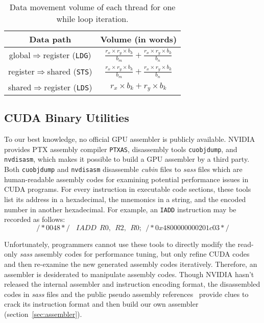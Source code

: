 \begin{table}[htbp]
    \caption{Data movement volume of each thread for one while loop iteration.} %
\centering
\scalebox{1.0} {
\begin{tabular}{|c|c|}
\hline
    Data path& Volume (in words)\\
\hline
    global$\Rightarrow$register ({\tt LDG})& $\frac{r_x \times r_y \times b_k}{b_m} + \frac{r_x\times r_y \times b_k}{b_n}$ \\
\hline
register$\Rightarrow$shared ({\tt STS})& $\frac{r_x \times r_y \times b_k}{b_m} + \frac{r_x\times r_y \times b_k}{b_n}$ \\
\hline
shared$\Rightarrow$register ({\tt LDS})& $r_x\times b_k + r_y\times b_k$\\
\hline
\end{tabular}
}
\label{tab:dm}
\end{table}


\subsection{CUDA Binary Utilities}
\label{sec:cuda}

To our best knowledge, no official GPU assembler is publicly available.
NVIDIA provides PTX assembly compiler {\tt PTXAS}, disassembly tools {\tt cuobjdump}, and {\tt nvdisasm}, which makes it possible to build a GPU assembler by a third party.
Both {\tt cuobjdump} and {\tt nvdisasm} disassemble {\em cubin} files to {\em sass} files which are human-readable assembly codes for examining potential performance issues in CUDA programs. 
For every instruction in executable code sections, these tools list its address in a hexadecimal, the mnemonics in a string, and the encoded number in another hexadecimal. 
For example, an {\tt IADD} instruction may be recorded as follows:
{\small
\begin{equation}
\label{eq:iadd}
/*0048*/~~~~IADD~~R0,~~R2,~~R0;~~/* 0x4800000000201c03 */
\end{equation}
}

Unfortunately, programmers cannot use these tools to directly modify the read-only {\em sass} assembly codes for performance tuning, but only refine CUDA codes and then re-examine the new generated assembly codes iteratively.
Therefore, an assembler is desiderated to manipulate assembly codes. 
Though NVIDIA hasn't released the internal assembler and instruction encoding format, the disassembled codes in {\em sass} files and the public pseudo assembly references~\cite{ptx2015isa} provide clues to crack its instruction format and then build our own assembler (section~\ref{sec:assembler}).


